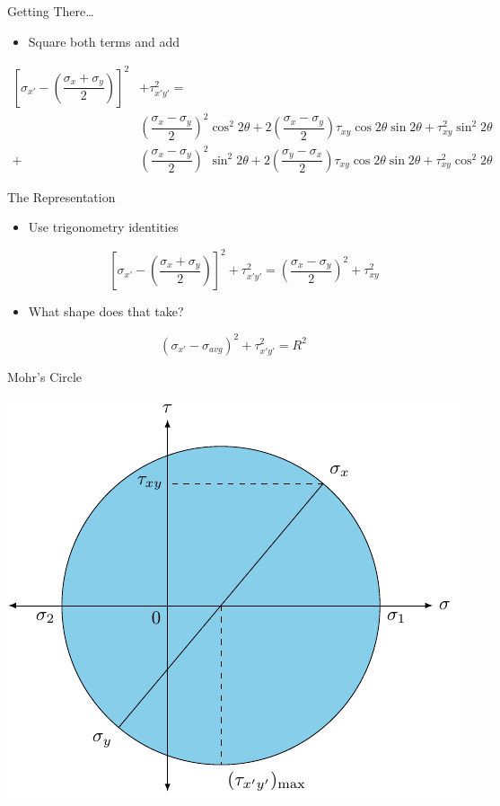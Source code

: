 \documentclass[10pt, svgnames]{beamer}
\begin{document}
\begin{frame}[label={sec:orgba60a05}]{Getting There\ldots{}}
\begin{itemize}
\item Square both terms and add
\end{itemize}

\begin{align*}
    \left[ \sigma_{x'} - \left( \dfrac{\sigma_x + \sigma_y}{2} \right) \right]^2 &+ \tau_{x'y'}^2 = \\
     & \left( \dfrac{\sigma_x - \sigma_y}{2} \right)^2\cos^2 2\theta  + 2\left( \dfrac{\sigma_x - \sigma_y}{2} \right)\tau_{xy}\cos 2\theta \sin 2\theta + \tau_{xy}^2\sin^2 2\theta \\
    +& \left( \dfrac{\sigma_x - \sigma_y}{2} \right)^2 \sin^2 2\theta  + 2\left( \dfrac{\sigma_y - \sigma_x}{2} \right)\tau_{xy}\cos 2\theta \sin 2\theta  + \tau_{xy}^2\cos^2 2\theta
\end{align*}
\end{frame}

\begin{frame}[label={sec:orgb095d2f}]{The Representation}
\begin{itemize}
\item Use trigonometry identities

\[\left[ \sigma_{x'} - \left( \dfrac{\sigma_x + \sigma_y}{2} \right) \right]^2 + \tau_{x'y'}^2 = \left( \dfrac{\sigma_x - \sigma_y}{2} \right)^2 + \tau_{xy}^2\]

\item What shape does that take?
\end{itemize}

\[\left( \sigma_{x'} - \sigma_{avg} \right)^2 + \tau_{x'y'}^2 = R^2\]
\end{frame}

\begin{frame}[label={sec:org0f66e91}]{Mohr's Circle}
\begin{center}
\includegraphics[height=0.9\textheight]{pictures/mohrs-circle.pdf}
\end{center}
\end{frame}
\end{document}

